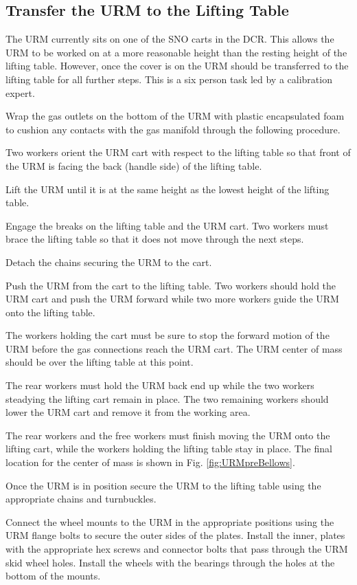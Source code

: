 \documentclass[11pt]{article}
\begin{document}
\subsection{Transfer the URM to the Lifting Table}\label{ss:transfer}
The URM currently sits on one of the SNO carts in the DCR. This allows the URM to be worked on at a more reasonable height than the resting height of the lifting table. However, once the cover is on the URM should be transferred to the lifting table for all further steps. This is a six person task led by a calibration expert.  
\begin{answerlist}
\item Wrap the gas outlets on the bottom of the URM with plastic
  encapsulated foam to cushion any contacts with the gas manifold
  through the following procedure.
\item Two workers orient the URM cart with respect to the lifting
  table so that front of the URM is facing the back (handle side) of
  the lifting table.
\item Lift the URM until it is at the same height as the lowest height
  of the lifting table.
\item Engage the breaks on the lifting table and the URM cart. Two
  workers must brace the lifting table so that it does not move
  through the next steps.
\item Detach the chains securing the URM to the cart.
\item Push the URM from the cart to the lifting table. Two workers
  should hold the URM cart and push the URM forward while two more
  workers guide the URM onto the lifting table.
\item The workers holding the cart must be sure to stop the forward
  motion of the URM before the gas connections reach the URM cart. The
  URM center of mass should be over the lifting table at this point.
\item The rear workers must hold the URM back end up while the two
  workers steadying the lifting cart remain in place. The two
  remaining workers should lower the URM cart and remove it from the
  working area.
\item The rear workers and the free workers must finish moving the URM
  onto the lifting cart, while the workers holding the lifting table
  stay in place. The final location for the center of mass is shown in
  Fig. \ref{fig:URMpreBellows}.
\item Once the URM is in position secure the URM to the lifting table
  using the appropriate chains and turnbuckles.
\item Connect the wheel mounts to the URM in the appropriate positions using the URM flange bolts to secure the outer sides of the plates. Install the inner, plates with the appropriate hex screws and connector bolts that pass through the URM skid wheel holes. Install the wheels with the bearings through the holes at the bottom of the mounts. 
\end{answerlist}
\end{document}
